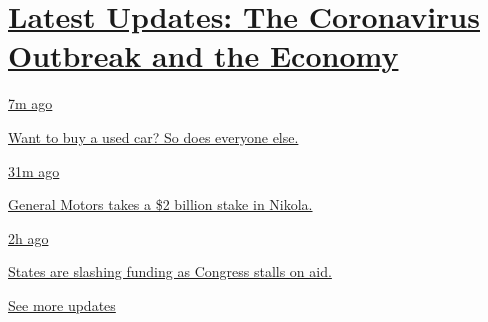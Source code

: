 \hypertarget{latest-updates-the-coronavirus-outbreak-and-the-economy}{%
\section{\texorpdfstring{\href{https://www.nytimes3xbfgragh.onion/live/2020/09/08/business/stock-market-today-coronavirus?action=click\&pgtype=Article\&state=default\&region=MAIN_CONTENT_1\&context=storylines_live_updates}{Latest
Updates: The Coronavirus Outbreak and the
Economy}}{Latest Updates: The Coronavirus Outbreak and the Economy}}\label{latest-updates-the-coronavirus-outbreak-and-the-economy}}

\href{https://www.nytimes3xbfgragh.onion/live/2020/09/08/business/stock-market-today-coronavirus?action=click\&pgtype=Article\&state=default\&region=MAIN_CONTENT_1\&context=storylines_live_updates\#want-to-buy-a-used-car-so-does-everyone-else}{7m
ago}

\href{https://www.nytimes3xbfgragh.onion/live/2020/09/08/business/stock-market-today-coronavirus?action=click\&pgtype=Article\&state=default\&region=MAIN_CONTENT_1\&context=storylines_live_updates\#want-to-buy-a-used-car-so-does-everyone-else}{Want
to buy a used car? So does everyone else.}

\href{https://www.nytimes3xbfgragh.onion/live/2020/09/08/business/stock-market-today-coronavirus?action=click\&pgtype=Article\&state=default\&region=MAIN_CONTENT_1\&context=storylines_live_updates\#general-motors-takes-a-2-billion-stake-in-nikola}{31m
ago}

\href{https://www.nytimes3xbfgragh.onion/live/2020/09/08/business/stock-market-today-coronavirus?action=click\&pgtype=Article\&state=default\&region=MAIN_CONTENT_1\&context=storylines_live_updates\#general-motors-takes-a-2-billion-stake-in-nikola}{General
Motors takes a \$2 billion stake in Nikola.}

\href{https://www.nytimes3xbfgragh.onion/live/2020/09/08/business/stock-market-today-coronavirus?action=click\&pgtype=Article\&state=default\&region=MAIN_CONTENT_1\&context=storylines_live_updates\#states-are-slashing-funding-as-congress-stalls-on-aid}{2h
ago}

\href{https://www.nytimes3xbfgragh.onion/live/2020/09/08/business/stock-market-today-coronavirus?action=click\&pgtype=Article\&state=default\&region=MAIN_CONTENT_1\&context=storylines_live_updates\#states-are-slashing-funding-as-congress-stalls-on-aid}{States
are slashing funding as Congress stalls on aid.}

\href{https://www.nytimes3xbfgragh.onion/live/2020/09/08/business/stock-market-today-coronavirus?action=click\&pgtype=Article\&state=default\&region=MAIN_CONTENT_1\&context=storylines_live_updates}{See
more updates}


